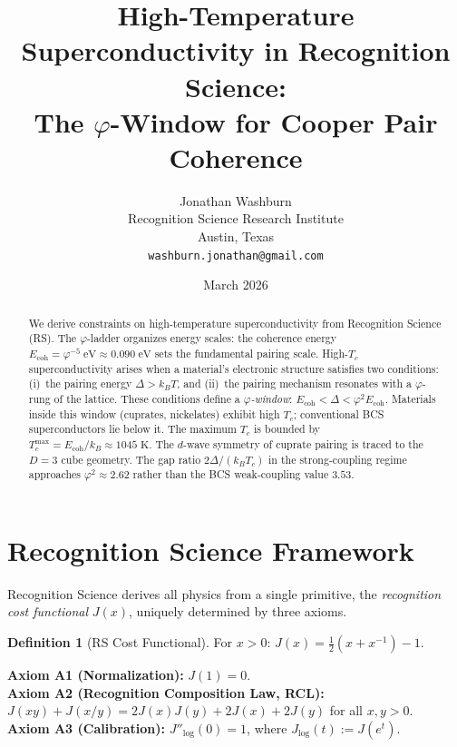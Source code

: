 \documentclass[12pt,a4paper]{article}
\title{High-Temperature Superconductivity in Recognition Science:\\
The $\varphi$-Window for Cooper Pair Coherence}
\author{Jonathan Washburn\\
Recognition Science Research Institute\\
Austin, Texas\\
\texttt{washburn.jonathan@gmail.com}}
\date{March 2026}
\theoremstyle{definition}
\newtheorem{definition}[theorem]{Definition}
\theoremstyle{remark}
\begin{document}
\maketitle

\begin{abstract}
We derive constraints on high-temperature superconductivity from
Recognition Science (RS).  The $\varphi$-ladder organizes energy
scales: the coherence energy
$E_{\mathrm{coh}} = \varphi^{-5}\;\mathrm{eV} \approx
0.090\;\mathrm{eV}$ sets the fundamental pairing scale.
High-$T_c$ superconductivity arises when a material's electronic
structure satisfies two conditions: (i)~the pairing energy
$\Delta > k_B T$, and (ii)~the pairing mechanism resonates with a
$\varphi$-rung of the lattice.  These conditions define a
\emph{$\varphi$-window}:
$E_{\mathrm{coh}} < \Delta < \varphi^2 E_{\mathrm{coh}}$.
Materials inside this window (cuprates, nickelates) exhibit
high $T_c$; conventional BCS superconductors lie below it.  The
maximum $T_c$ is bounded by
$T_c^{\max} = E_{\mathrm{coh}}/k_B \approx 1045\;\mathrm{K}$.
The $d$-wave symmetry of cuprate pairing is traced to the
$D = 3$ cube geometry.  The gap ratio
$2\Delta/(k_B T_c)$ in the strong-coupling regime approaches
$\varphi^2 \approx 2.62$ rather than the BCS weak-coupling
value $3.53$.
\end{abstract}

\section{Recognition Science Framework}
\label{sec:framework}

Recognition Science derives all physics from a single primitive,
the \emph{recognition cost functional} $J(x)$, uniquely determined
by three axioms.

\begin{definition}[RS Cost Functional]
For $x > 0$: $J(x) = \tfrac{1}{2}(x + x^{-1}) - 1$.
\end{definition}

\noindent\textbf{Axiom A1 (Normalization):} $J(1) = 0$.\\
\textbf{Axiom A2 (Recognition Composition Law, RCL):}
$J(xy) + J(x/y) = 2J(x)J(y) + 2J(x) + 2J(y)$ for all $x, y > 0$.\\
\textbf{Axiom A3 (Calibration):} $J''_{\log}(0) = 1$, where
$J_{\log}(t) := J(e^t)$.
\end{document}
